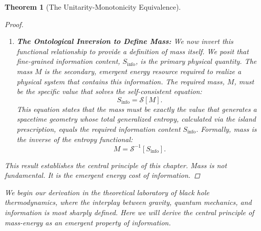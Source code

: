 \documentclass[11pt, letterpaper]{report}
\theoremstyle{plain} %
\newtheorem{theorem}{Theorem}[chapter]
\theoremstyle{definition} %
\theoremstyle{remark} %
\begin{document}
\begin{theorem}[The Unitarity-Monotonicity Equivalence]
\begin{proof}
\begin{enumerate}
    \item \textbf{The Ontological Inversion to Define Mass:} We now invert this functional relationship to provide a definition of mass itself. We posit that fine-grained information content, $S_{\text{info}}$, is the primary physical quantity. The mass $M$ is the secondary, emergent energy resource required to realize a physical system that contains this information. The required mass, $M$, must be the specific value that solves the self-consistent equation:
    \begin{equation}
        S_{\text{info}} = \mathcal{S}[M].
    \end{equation}
    This equation states that the mass must be exactly the value that generates a spacetime geometry whose total generalized entropy, calculated via the island prescription, equals the required information content $S_{\text{info}}$. Formally, mass is the inverse of the entropy functional:
    \begin{equation}
        M = \mathcal{S}^{-1}[S_{\text{info}}].
    \end{equation}
\end{enumerate}
This result establishes the central principle of this chapter. Mass is not fundamental. It is the emergent energy cost of information.
\end{proof}








We begin our derivation in the theoretical laboratory of black hole thermodynamics, where the interplay between gravity, quantum mechanics, and information is most sharply defined. Here we will derive the central principle of mass-energy as an emergent property of information.


\end{theorem}
\end{document}
